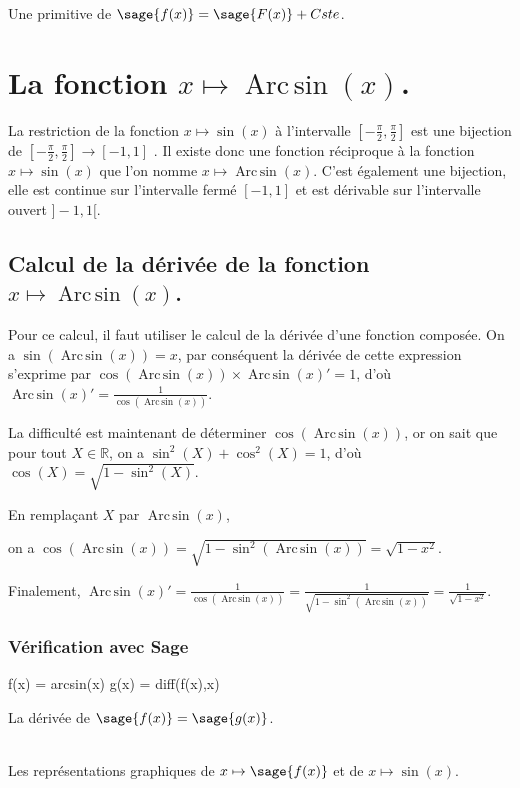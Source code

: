 \documentclass[a4paper,14pt]{extreport} %
\def\eclaire{\mathbb}
\def\R{\ensuremath{\eclaire R}}
\renewcommand{\arcsin}{\mathop{\mathrm{Arc\,sin}}}
\begin{document}
Une primitive de $\sage{f(x)} = \sage{F(x)} + Cste$.


\section{La fonction  $x \mapsto \arcsin(x) $.}

La restriction de la fonction $x \mapsto \sin(x) $ à l'intervalle $\left[-\frac{\pi}{2},\frac{\pi}{2}\right]$ est une bijection de $\left[-\frac{\pi}{2},\frac{\pi}{2}\right] \rightarrow [-1,1]$ . Il existe donc une fonction réciproque à la fonction $x \mapsto \sin(x) $ que l'on nomme $x \mapsto \arcsin(x) $. C'est également une bijection, elle est continue sur l'intervalle fermé  $ [-1,1]$ et est dérivable sur l'intervalle ouvert $]-1,1[$.

\subsection{Calcul de la dérivée de la fonction $x \mapsto \arcsin(x) $.}


Pour ce calcul, il faut utiliser le calcul de la dérivée d'une fonction composée. On a $\sin(\arcsin(x))=x$, par conséquent la dérivée de cette expression s'exprime par $ \cos(\arcsin(x)) \times \arcsin(x) ' = 1$, d'où $\arcsin(x) ' = \frac{1}{\cos(\arcsin(x))} $.

La difficulté est maintenant de déterminer $\cos(\arcsin(x))$, or on sait que pour tout $X \in \R$, on a $\sin^2(X) + \cos^2(X) = 1$, d'où $\cos(X) = \sqrt{1-\sin^2(X)}$.

En remplaçant $X$ par $\arcsin(x)$, 

on a $\cos(\arcsin(x)) = \sqrt{1-\sin^2(\arcsin(x))} = \sqrt{1- x^2}$.

Finalement, $\arcsin(x) ' = \frac{1}{\cos(\arcsin(x))}  = \frac{1}{\sqrt{1-\sin^2(\arcsin(x))}} =  \frac{1}{\sqrt{1- x^2}} $.

\subsubsection{Vérification avec Sage}

\begin{sageblock}
    f(x) = arcsin(x)
    g(x) = diff(f(x),x)
\end{sageblock}

La dérivée de $\sage{f(x)} = \sage{g(x)} $.


\begin{center}
\\
Les représentations graphiques de $x \mapsto \sage{f(x)} $ et de $x\mapsto \sin(x)$.
\end{center}
\end{document}
